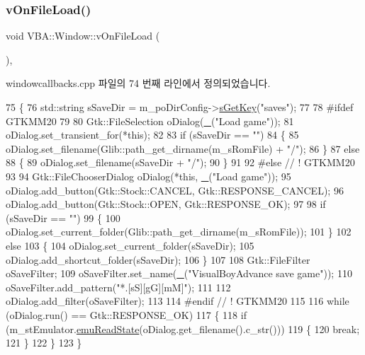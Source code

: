 \subsubsection{\texorpdfstring{v\+On\+File\+Load()}{vOnFileLoad()}}
{\footnotesize\ttfamily void V\+B\+A\+::\+Window\+::v\+On\+File\+Load (\begin{DoxyParamCaption}{ }\end{DoxyParamCaption})\hspace{0.3cm}{\ttfamily [protected]}, {\ttfamily [virtual]}}



windowcallbacks.\+cpp 파일의 74 번째 라인에서 정의되었습니다.


\begin{DoxyCode}
75 \{
76   std::string sSaveDir = m\_poDirConfig->\mbox{\hyperlink{class_v_b_a_1_1_config_1_1_section_a7ac9dfabf38bc1db83a6017e130f04ac}{sGetKey}}(\textcolor{stringliteral}{"saves"});
77 
78 \textcolor{preprocessor}{#ifdef GTKMM20}
79 
80   Gtk::FileSelection oDialog(\mbox{\hyperlink{getopt_8c_a86a239addea586602343007a370bf8ad}{\_}}(\textcolor{stringliteral}{"Load game"}));
81   oDialog.set\_transient\_for(*\textcolor{keyword}{this});
82 
83   \textcolor{keywordflow}{if} (sSaveDir == \textcolor{stringliteral}{""})
84   \{
85     oDialog.set\_filename(Glib::path\_get\_dirname(m\_sRomFile) + \textcolor{stringliteral}{"/"});
86   \}
87   \textcolor{keywordflow}{else}
88   \{
89     oDialog.set\_filename(sSaveDir + \textcolor{stringliteral}{"/"});
90   \}
91 
92 \textcolor{preprocessor}{#else // ! GTKMM20}
93 
94   Gtk::FileChooserDialog oDialog(*\textcolor{keyword}{this}, \mbox{\hyperlink{getopt_8c_a86a239addea586602343007a370bf8ad}{\_}}(\textcolor{stringliteral}{"Load game"}));
95   oDialog.add\_button(Gtk::Stock::CANCEL, Gtk::RESPONSE\_CANCEL);
96   oDialog.add\_button(Gtk::Stock::OPEN,   Gtk::RESPONSE\_OK);
97 
98   \textcolor{keywordflow}{if} (sSaveDir == \textcolor{stringliteral}{""})
99   \{
100     oDialog.set\_current\_folder(Glib::path\_get\_dirname(m\_sRomFile));
101   \}
102   \textcolor{keywordflow}{else}
103   \{
104     oDialog.set\_current\_folder(sSaveDir);
105     oDialog.add\_shortcut\_folder(sSaveDir);
106   \}
107 
108   Gtk::FileFilter oSaveFilter;
109   oSaveFilter.set\_name(\mbox{\hyperlink{getopt_8c_a86a239addea586602343007a370bf8ad}{\_}}(\textcolor{stringliteral}{"VisualBoyAdvance save game"}));
110   oSaveFilter.add\_pattern(\textcolor{stringliteral}{"*.[sS][gG][mM]"});
111 
112   oDialog.add\_filter(oSaveFilter);
113 
114 \textcolor{preprocessor}{#endif // ! GTKMM20}
115 
116   \textcolor{keywordflow}{while} (oDialog.run() == Gtk::RESPONSE\_OK)
117   \{
118     \textcolor{keywordflow}{if} (m\_stEmulator.\mbox{\hyperlink{struct_emulated_system_a1ad8780083ad23c2cbe474fc570745ea}{emuReadState}}(oDialog.get\_filename().c\_str()))
119     \{
120       \textcolor{keywordflow}{break};
121     \}
122   \}
123 \}
\end{DoxyCode}
